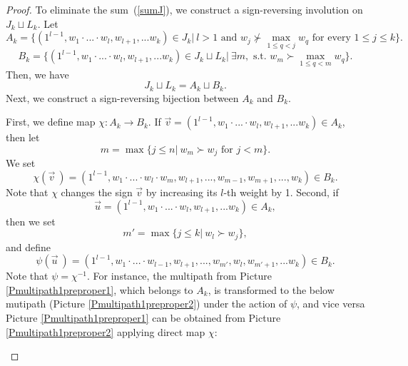 \documentclass{article}
\theoremstyle{plain}
\theoremstyle{definition}
\begin{document}
\begin{proof}
To eliminate the sum~(\ref{sumJ}), we construct a sign-reversing involution on $J_k\sqcup L_k$. Let
$$A_k=\{ (1^{l-1},w_1\cdot ...\cdot w_l,w_{l+1},...w_k)\in J_k|\ l>1 \text{ and } w_j\nsucc \max\limits_{1\leq q<j}{w_q} \text{ for every } 1\leq j\leq k  \}.$$
$$B_k=\{ (1^{l-1},w_1\cdot ...\cdot w_l,w_{l+1},...w_k)\in J_k\sqcup L_k|\ \exists m,\text{ s.t. } w_m\succ \max\limits_{1\leq q<m}{w_q} \}.$$
Then, we have $$J_k\sqcup L_k=A_k\sqcup B_k.$$
Next, we construct a sign-reversing bijection between $A_k$ and $B_k$.

First, we define map $\chi: A_k\to B_k$. If  $\vec{v}=(1^{l-1},w_1\cdot ...\cdot w_l,w_{l+1},...w_k)\in A_k$, then let $$m=\max\{j\leq n|\ w_m\succ w_j \text{ for } j<m\}.$$ We set $$\chi(\vec{v}\ )= (1^{l-1},w_1\cdot ...\cdot w_l\cdot w_m,w_{l+1},...,w_{m-1},w_{m+1},...,w_k)\in B_k.$$ 
Note that $\chi$ changes the sign $\vec{v}$ by increasing its $l$-th weight by 1.
Second, if $$\vec{u}=(1^{l-1},w_1\cdot ...\cdot w_l,w_{l+1},...w_k)\in A_k,$$ then we set $$m'=\max\{j\leq k|\ w_l\succ w_j\},$$ and define $$\psi(\vec{u}\ ) = (1^{l-1},w_1\cdot ...\cdot w_{l-1},w_{l+1},...,w_{m'},w_l,w_{m'+1},...w_k)\in B_k.$$
Note that $\psi=\chi^{-1}.$
For instance, the multipath from Picture \ref{Pmultipath1preproper1}, which belongs to $A_k$, is transformed to the below mutipath (Picture \ref{Pmultipath1preproper2}) under the action of $\psi$, and vice versa Picture \ref{Pmultipath1preproper1} can be obtained from Picture  \ref{Pmultipath1preproper2} applying direct map $\chi$:

\begin{figure}[H]
\hspace*{-0.5cm} 
\end{figure}
\end{proof}
\end{document}
